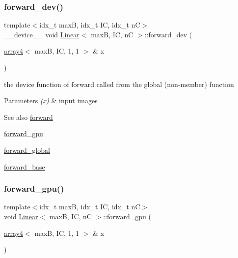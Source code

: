 \subsubsection{\texorpdfstring{forward\+\_\+dev()}{forward\_dev()}}
{\footnotesize\ttfamily template$<$idx\+\_\+t maxB, idx\+\_\+t IC, idx\+\_\+t nC$>$ \\
\+\_\+\+\_\+device\+\_\+\+\_\+ void \hyperlink{structLinear}{Linear}$<$ maxB, IC, nC $>$\+::forward\+\_\+dev (\begin{DoxyParamCaption}\item[{\hyperlink{structarray4}{array4}$<$ maxB, IC, 1, 1 $>$ \&}]{x }\end{DoxyParamCaption})\hspace{0.3cm}{\ttfamily [inline]}}



the device function of forward called from the global (non-\/member) function 


\begin{DoxyParams}{Parameters}
{\em (x)} & input images \\
\hline
\end{DoxyParams}
\begin{DoxySeeAlso}{See also}
\hyperlink{structLinear_aed0294f2d1c2013f66d89a52474352e5}{forward} 

\hyperlink{structLinear_a1d794073640bad48f9722f5d40b98902}{forward\+\_\+gpu} 

\hyperlink{softmaxcrossentropy_8h_a578aeeb166bd06e800d9b396eab48b35}{forward\+\_\+global} 

\hyperlink{structLinear_adb02d44e0558e4e26b9a550945cd3b7e}{forward\+\_\+base} 
\end{DoxySeeAlso}
\mbox{\label{structLinear_a1d794073640bad48f9722f5d40b98902}} 
\subsubsection{\texorpdfstring{forward\+\_\+gpu()}{forward\_gpu()}}
{\footnotesize\ttfamily template$<$idx\+\_\+t maxB, idx\+\_\+t IC, idx\+\_\+t nC$>$ \\
void \hyperlink{structLinear}{Linear}$<$ maxB, IC, nC $>$\+::forward\+\_\+gpu (\begin{DoxyParamCaption}\item[{\hyperlink{structarray4}{array4}$<$ maxB, IC, 1, 1 $>$ \&}]{x }\end{DoxyParamCaption})\hspace{0.3cm}{\ttfamily [inline]}}



